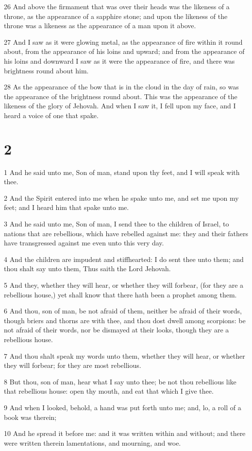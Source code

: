 \par 26 And above the firmament that was over their heads was the likeness of a throne, as the appearance of a sapphire stone; and upon the likeness of the throne was a likeness as the appearance of a man upon it above.
\par 27 And I saw as it were glowing metal, as the appearance of fire within it round about, from the appearance of his loins and upward; and from the appearance of his loins and downward I saw as it were the appearance of fire, and there was brightness round about him.
\par 28 As the appearance of the bow that is in the cloud in the day of rain, so was the appearance of the brightness round about. This was the appearance of the likeness of the glory of Jehovah. And when I saw it, I fell upon my face, and I heard a voice of one that spake.

\chapter{2}

\par 1 And he said unto me, Son of man, stand upon thy feet, and I will speak with thee.
\par 2 And the Spirit entered into me when he spake unto me, and set me upon my feet; and I heard him that spake unto me.
\par 3 And he said unto me, Son of man, I send thee to the children of Israel, to nations that are rebellious, which have rebelled against me: they and their fathers have transgressed against me even unto this very day.
\par 4 And the children are impudent and stiffhearted: I do sent thee unto them; and thou shalt say unto them, Thus saith the Lord Jehovah.
\par 5 And they, whether they will hear, or whether they will forbear, (for they are a rebellious house,) yet shall know that there hath been a prophet among them.
\par 6 And thou, son of man, be not afraid of them, neither be afraid of their words, though briers and thorns are with thee, and thou dost dwell among scorpions: be not afraid of their words, nor be dismayed at their looks, though they are a rebellious house.
\par 7 And thou shalt speak my words unto them, whether they will hear, or whether they will forbear; for they are most rebellious.
\par 8 But thou, son of man, hear what I say unto thee; be not thou rebellious like that rebellious house: open thy mouth, and eat that which I give thee.
\par 9 And when I looked, behold, a hand was put forth unto me; and, lo, a roll of a book was therein;
\par 10 And he spread it before me: and it was written within and without; and there were written therein lamentations, and mourning, and woe.

